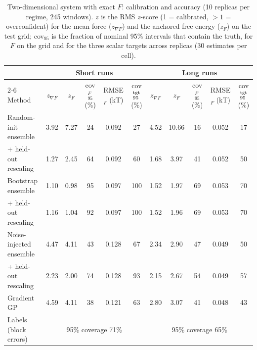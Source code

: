 \begin{table}
\caption{Two-dimensional system with exact $F$: calibration and accuracy (10 replicas per regime, 245 windows). $z$ is the RMS $z$-score (1 = calibrated, $>1$ = overconfident) for the mean force ($z_{\nabla F}$) and the anchored free energy ($z_F$) on the test grid; cov$_{95}$ is the fraction of nominal 95\% intervals that contain the truth, for $F$ on the grid and for the three scalar targets across replicas (30 estimates per cell).}
\label{tab:2d}
\begin{ruledtabular}
\begin{tabular}{lcccccccccc}
 & \multicolumn{5}{c}{Short runs} & \multicolumn{5}{c}{Long runs} \\
\cline{2-6}\cline{7-11}
Method & $z_{\nabla F}$ & $z_F$ & cov$_{95}^F$ (\%) & RMSE$_F$ (kT) & cov$_{95}^{\rm tgt}$ (\%) & $z_{\nabla F}$ & $z_F$ & cov$_{95}^F$ (\%) & RMSE$_F$ (kT) & cov$_{95}^{\rm tgt}$ (\%) \\
\hline
Random-init ensemble & 3.92 & 7.27 & 24 & 0.092 & 27 & 4.52 & 10.66 & 16 & 0.052 & 17 \\
\quad + held-out rescaling & 1.27 & 2.45 & 64 & 0.092 & 60 & 1.68 & 3.97 & 41 & 0.052 & 50 \\
Bootstrap ensemble & 1.10 & 0.98 & 95 & 0.097 & 100 & 1.52 & 1.97 & 69 & 0.053 & 70 \\
\quad + held-out rescaling & 1.16 & 1.04 & 92 & 0.097 & 100 & 1.52 & 1.96 & 69 & 0.053 & 70 \\
Noise-injected ensemble & 4.47 & 4.11 & 43 & 0.128 & 67 & 2.34 & 2.90 & 47 & 0.049 & 50 \\
\quad + held-out rescaling & 2.23 & 2.00 & 74 & 0.128 & 93 & 2.15 & 2.67 & 54 & 0.049 & 57 \\
Gradient GP & 4.59 & 4.11 & 38 & 0.121 & 63 & 2.80 & 3.07 & 41 & 0.048 & 43 \\
\hline
Labels (block errors) & \multicolumn{5}{c}{95\% coverage 71\%} & \multicolumn{5}{c}{95\% coverage 65\%} \\
\end{tabular}
\end{ruledtabular}
\end{table}
